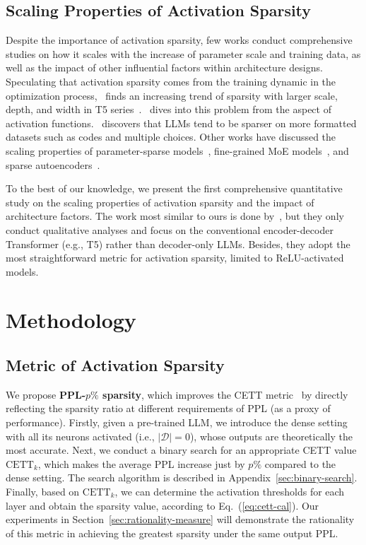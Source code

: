 \documentclass{article} %
\begin{document}
\subsection{Scaling Properties of Activation Sparsity}

Despite the importance of activation sparsity, few works conduct comprehensive studies on how it scales with the increase of parameter scale and training data, as well as the impact of other influential factors within architecture designs. Speculating that activation sparsity comes from the training dynamic in the optimization process,~\citet{li2022lazy} finds an increasing trend of sparsity with larger scale, depth, and width in T5 series~\citep{raffel2020exploring}.~\citet{zhang2024relu} dives into this problem from the aspect of activation functions.~\citet{song2024prosparse} discovers that LLMs tend to be sparser on more formatted datasets such as codes and multiple choices. Other works have discussed the scaling properties of parameter-sparse models~\citep{frantar2023scaling}, fine-grained MoE models~\citep{krajewski2024scaling}, and sparse autoencoders~\citep{gao2024scaling}.


To the best of our knowledge, we present the first comprehensive quantitative study on the scaling properties of activation sparsity and the impact of architecture factors. The work most similar to ours is done by~\citet{li2022lazy}, but they only conduct qualitative analyses and focus on the conventional encoder-decoder Transformer (e.g., T5) rather than decoder-only LLMs. Besides, they adopt the most straightforward metric for activation sparsity, limited to ReLU-activated models.

\section{Methodology}

\subsection{Metric of Activation Sparsity}

We propose \textbf{PPL-$p\%$ sparsity}, which improves the CETT metric~\citep{zhang2024relu} by directly reflecting the sparsity ratio at different requirements of PPL (as a proxy of performance). Firstly, given a pre-trained LLM, we introduce the dense setting with all its neurons activated (i.e., $|\mathcal{D}|=0$), whose outputs are theoretically the most accurate. Next, we conduct a binary search for an appropriate CETT value $\mathrm{CETT}_k$, which makes the average PPL increase just by $p\%$ compared to the dense setting. The search algorithm is described in Appendix~\ref{sec:binary-search}. Finally, based on $\mathrm{CETT}_k$, we can determine the activation thresholds for each layer and obtain the sparsity value, according to Eq.~(\ref{eq:cett-cal}). Our experiments in Section~\ref{sec:rationality-measure} will demonstrate the rationality of this metric in achieving the greatest sparsity under the same output PPL.
\end{document}
